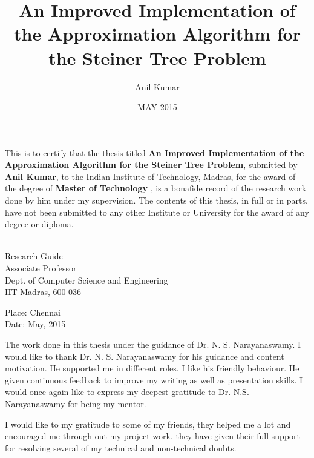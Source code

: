 \documentclass[MTech,thesis]{iitmdiss}
\def\thesistitle{An Improved Implementation of the Approximation Algorithm for the Steiner Tree Problem}
\def\thesisauthor{Anil Kumar}
\begin{document}
%

\title{\thesistitle}
\author{\thesisauthor}
\date{MAY 2015}
\maketitle

\certificate

\vspace*{0.5in}

\noindent This is to certify that the thesis titled {\bf {\thesistitle}}, submitted by {\bf {\thesisauthor}}, to the Indian Institute of Technology,
Madras, for the award of the degree of {\bf Master of Technology }, is a bonafide record of the research work done by him under my
supervision. The contents of this thesis, in full or in parts, have not been submitted to any other Institute or University for the award of any
degree or diploma.

\vspace*{1in}
\hspace*{-0.25in}
\begin{singlespace}
\\
\noindent Research Guide\\ 
\noindent Associate Professor\\
\noindent Dept. of Computer Science and Engineering\\
\noindent IIT-Madras, 600 036 \\
\end{singlespace}
\vspace*{0.20in}
\noindent Place: Chennai\\ 
Date: May, 2015


\acknowledgements
The work done in this thesis under the guidance of Dr. N. S. Narayanaswamy. I would like to thank Dr. N. S. Narayanaswamy for his guidance and content motivation. He supported me in different roles. I like his friendly behaviour. He given continuous feedback to improve my writing as well as presentation skills. I would once again like to express my deepest gratitude to Dr. N.S. Narayanaswamy for being my mentor.

I would like to my gratitude to some of my friends, they helped me a lot and encouraged me through out my project work. they have given their full support for resolving several of my technical and non-technical doubts. 
\end{document}
